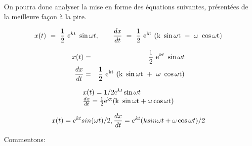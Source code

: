 On pourra donc analyser la mise en forme des équations suivantes, présentées de la meilleure façon à la pire.

\begin{equation}
\displaystyle
x (t) ~=~\dfrac{1}{2}~\textrm{e}^{k t}~\sin\omega t, \qquad \frac{ d x }{ d t}~=~\dfrac{1}{2}~ \rm{e}^{k t}~(k~\sin \omega t~-~\omega~\cos\omega t)
\label{eq:xv1}
\end{equation}


\begin{eqnarray}
\displaystyle
x (t) &=&\dfrac{1}{2}~\textrm{e}^{k t}~\sin\omega t \label{eq:xv2a} \\
\displaystyle \frac{ d x }{ d t}&=& \dfrac{1}{2}~ \rm{e}^{k t}~(k~\sin \omega t~+~\omega~\cos\omega t)
\label{eq:xv2b}
\end{eqnarray}

\begin{equation}
\begin{array}{l}
x(t) = 1/2 \textrm{e}^{k t} \sin\omega t\\
\frac{ d x }{ d t}=\frac{1}{2}\rm{e}^{k t}(k~\sin \omega t+\omega\cos\omega t)
\end{array}
\label{eq:xv3}
\end{equation}

\begin{equation}
x(t) = e^{k t} sin(\omega t)/2,   \frac{ d x }{ d t}=e^{k t}(k sin \omega t+\omega\cos\omega t) / 2
\label{eq:xv4}
\end{equation}

Commentons:

